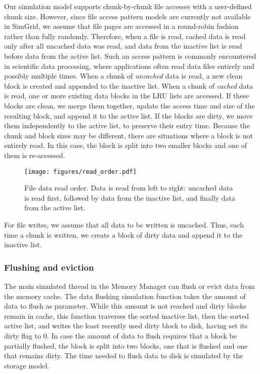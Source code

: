\documentclass[conference]{IEEEtran}
\begin{document}
    Our simulation model supports chunk-by-chunk file accesses
    with a user-defined chunk size. However, since file access pattern models are currently not available in SimGrid, we assume that file pages are
    accessed in a round-robin fashion rather than fully randomly.
    Therefore, when a file is read, cached data is read only after all uncached data was read, and data from the inactive list is read
    before data from the active list. Such an access pattern is commonly encountered in scientific data processing, where 
    applications often read data files entirely and possibly multiple times. 
    When a chunk of \emph{uncached} data is read, a new clean block is created
    and appended to the inactive list.
    When a chunk of \emph{cached} data is read, one or more existing data blocks in the LRU lists are accessed.
    If these blocks are clean, we merge them together, update the access time and size of the resulting block,
    and append it to the active list.
    If the blocks are dirty, we move them independently to the active list, to preserve their entry time.
    Because the chunk and block sizes may be different, there are situations
    where a block is not entirely read.
    In this case, the block is split into two smaller blocks and one of them is re-accessed.
    \begin{figure}
           \centering
           \texttt{[image: figures/read\_order.pdf]}
           \caption{File data read order. Data is read from left to right: uncached data
           is read first, followed by data from the inactive list, and finally data from the active list. }
           \label{fig:read_order}
    \end{figure}

    For file writes, we assume that all data to be written is
    uncached. Thus, each time a chunk is written, we create a block of dirty data
    and append it to the inactive list.

    \subsubsection{Flushing and eviction}

    The main simulated thread in the Memory Manager can flush or evict data from the
    memory cache. The data flushing simulation
    function takes the amount of data to flush as parameter. While
    this amount is not reached and dirty
    blocks remain in cache, this function traverses the sorted
    inactive list, then the sorted active list, and writes the
    least recently used dirty block to disk, having set its dirty
    flag to 0. In case the amount of data to flush requires that a
    block be partially flushed, the block is split into two blocks,
    one that is flushed and one that remains dirty. The time needed
    to flush data to disk is simulated by the storage model.
\end{document}
